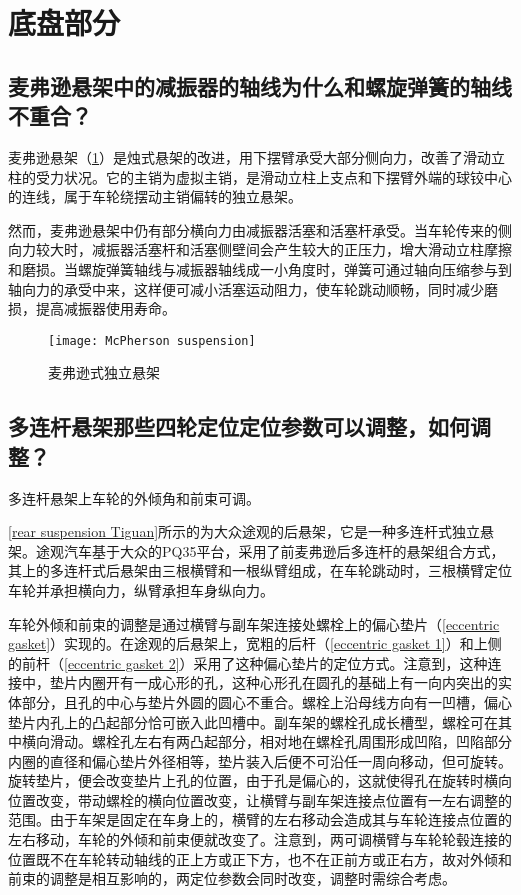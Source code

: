 \documentclass[UTF8]{ctexart}
\numberwithin{figure}{section}
\numberwithin{table}{section}
\begin{document}
\clearpage

\section{底盘部分}
\subsection{麦弗逊悬架中的减振器的轴线为什么和螺旋弹簧的轴线不重合？}

麦弗逊悬架（\cref{McPherson suspension}）是烛式悬架的改进，用下摆臂承受大部分侧向力，改善了滑动立柱的受力状况。它的主销为虚拟主销，是滑动立柱上支点和下摆臂外端的球铰中心的连线，属于车轮绕摆动主销偏转的独立悬架。

然而，麦弗逊悬架中仍有部分横向力由减振器活塞和活塞杆承受。当车轮传来的侧向力较大时，减振器活塞杆和活塞侧壁间会产生较大的正压力，增大滑动立柱摩擦和磨损。当螺旋弹簧轴线与减振器轴线成一小角度时，弹簧可通过轴向压缩参与到轴向力的承受中来，这样便可减小活塞运动阻力，使车轮跳动顺畅，同时减少磨损，提高减振器使用寿命。

\begin{figure}[htbp]
	\centering
	\begin{minipage}[b]{0.8\textwidth}
		\centering
		\texttt{[image: McPherson suspension]}
		\caption{麦弗逊式独立悬架}
		\label{McPherson suspension}
	\end{minipage}
\end{figure}

\subsection{多连杆悬架那些四轮定位定位参数可以调整，如何调整？}

多连杆悬架上车轮的外倾角和前束可调。

\cref{rear suspension Tiguan}所示的为大众途观的后悬架，它是一种多连杆式独立悬架。途观汽车基于大众的PQ35平台，采用了前麦弗逊后多连杆的悬架组合方式，其上的多连杆式后悬架由三根横臂和一根纵臂组成，在车轮跳动时，三根横臂定位车轮并承担横向力，纵臂承担车身纵向力。

车轮外倾和前束的调整是通过横臂与副车架连接处螺栓上的偏心垫片（\cref{eccentric gasket}）实现的。在途观的后悬架上，宽粗的后杆（\cref{eccentric gasket 1}）和上侧的前杆（\cref{eccentric gasket 2}）采用了这种偏心垫片的定位方式。注意到，这种连接中，垫片内圈开有一成心形的孔，这种心形孔在圆孔的基础上有一向内突出的实体部分，且孔的中心与垫片外圆的圆心不重合。螺栓上沿母线方向有一凹槽，偏心垫片内孔上的凸起部分恰可嵌入此凹槽中。副车架的螺栓孔成长槽型，螺栓可在其中横向滑动。螺栓孔左右有两凸起部分，相对地在螺栓孔周围形成凹陷，凹陷部分内圈的直径和偏心垫片外径相等，垫片装入后便不可沿任一周向移动，但可旋转。旋转垫片，便会改变垫片上孔的位置，由于孔是偏心的，这就使得孔在旋转时横向位置改变，带动螺栓的横向位置改变，让横臂与副车架连接点位置有一左右调整的范围。由于车架是固定在车身上的，横臂的左右移动会造成其与车轮连接点位置的左右移动，车轮的外倾和前束便就改变了。注意到，两可调横臂与车轮轮毂连接的位置既不在车轮转动轴线的正上方或正下方，也不在正前方或正右方，故对外倾和前束的调整是相互影响的，两定位参数会同时改变，调整时需综合考虑。
\end{document}
